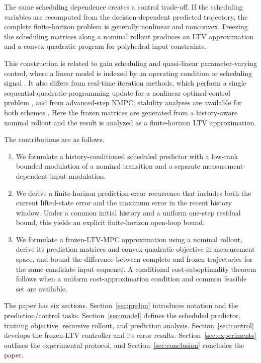 \documentclass[journal]{IEEEtran}
\begin{document}
The same scheduling dependence creates a control trade-off. If the scheduling variables are recomputed from the decision-dependent predicted trajectory, the complete finite-horizon problem is generally nonlinear and nonconvex. Freezing the scheduling matrices along a nominal rollout produces an LTV approximation and a convex quadratic program for polyhedral input constraints.

This construction is related to gain scheduling and quasi-linear parameter-varying control, where a linear model is indexed by an operating condition or scheduling signal \cite{rugh2000gain,leith1998velocity,cisneros2016qlmpc,cisneros2020qlpv}. It also differs from real-time iteration methods, which perform a single sequential-quadratic-programming update for a nonlinear optimal-control problem \cite{diehl2005realtime,gros2020rti}, and from advanced-step NMPC; stability analyses are available for both schemes \cite{diehl2005rtistability,zavala2009advancedstep}. Here the frozen matrices are generated from a history-aware nominal rollout and the result is analyzed as a finite-horizon LTV approximation.

The contributions are as follows.
\begin{enumerate}
    \item We formulate a history-conditioned scheduled predictor with a low-rank bounded modulation of a nominal transition and a separate measurement-dependent input modulation.
    \item We derive a finite-horizon prediction-error recurrence that includes both the current lifted-state error and the maximum error in the recent history window. Under a common initial history and a uniform one-step residual bound, this yields an explicit finite-horizon open-loop bound.
    \item We formulate a frozen-LTV-MPC approximation using a nominal rollout, derive its prediction matrices and convex quadratic objective in measurement space, and bound the difference between complete and frozen trajectories for the same candidate input sequence. A conditional cost-suboptimality theorem follows when a uniform cost-approximation condition and common feasible set are available.
\end{enumerate}

The paper has six sections. Section~\ref{sec:prelim} introduces notation and the prediction/control tasks. Section~\ref{sec:model} defines the scheduled predictor, training objective, recursive rollout, and prediction analysis. Section~\ref{sec:control} develops the frozen-LTV controller and its error results. Section~\ref{sec:experiments} outlines the experimental protocol, and Section~\ref{sec:conclusion} concludes the paper.
\end{document}
